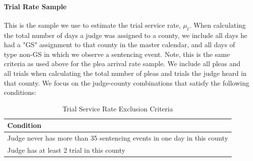 \documentclass[11pt]{article}
\theoremstyle{ModifiedStyle}
\begin{document}
      \paragraph{Trial Rate Sample} This is the sample we use to estimate the trial service rate, $\mu_t$. When calculating the total number of days a judge was assigned to a county, we include all days he had a "GS" assignment to that county in the master calendar, and all days of type non-GS in which we observe a sentencing event. Note, this is the same criteria as used above for the plea arrival rate sample. We include all pleas and all trials when calculating the total number of pleas and trials the judge heard in that county. We focus on the judge-county combinations that satisfy the following conditions:

        \begin{table}[H]
        \centering
        \caption{Trial Service Rate Exclusion Criteria}
        \begin{tabular}{|l|}
        \hline
        \textbf{Condition}                                                       \\ \hline
        Judge never has more than 35 sentencing events in one day in this county \\
        Judge has at least 2 trial in this county                                \\ \hline
        \end{tabular}
        \end{table}

\end{document}
